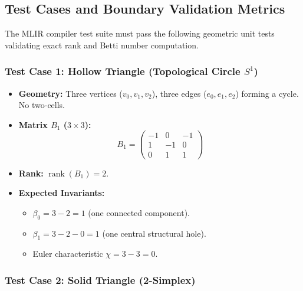 \documentclass[manuscript, nonacm, review=false]{acmart}
\theoremstyle{definition}
\theoremstyle{plain}
\newcommand{\rank}{\operatorname{rank}}
\begin{document}
\subsection{Test Cases and Boundary Validation Metrics}
\label{subsec:ir_tests}

The MLIR compiler test suite must pass the following geometric unit tests validating exact rank and Betti number computation.

\subsubsection{Test Case 1: Hollow Triangle (Topological Circle $S^1$)}

\begin{itemize}
    \item \textbf{Geometry:} Three vertices ($v_0, v_1, v_2$), three edges ($e_0, e_1, e_2$) forming a cycle. No two-cells.
    \item \textbf{Matrix $B_1$ ($3 \times 3$):}
    \begin{equation}
        B_1 = \begin{pmatrix} -1 & 0 & -1 \\ 1 & -1 & 0 \\ 0 & 1 & 1 \end{pmatrix}
    \end{equation}
    \item \textbf{Rank:} $\rank(B_1) = 2$.
    \item \textbf{Expected Invariants:}
    \begin{itemize}
        \item $\beta_0 = 3 - 2 = 1$ (one connected component).
        \item $\beta_1 = 3 - 2 - 0 = 1$ (one central structural hole).
        \item Euler characteristic $\chi = 3 - 3 = 0$.
    \end{itemize}
\end{itemize}

\subsubsection{Test Case 2: Solid Triangle (2-Simplex)}
\end{document}
